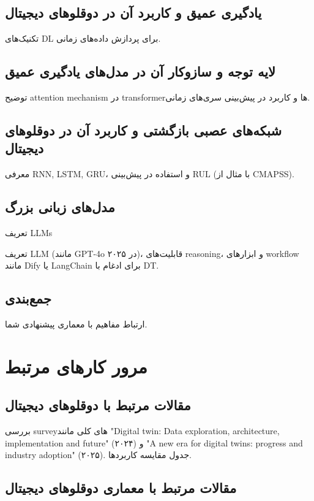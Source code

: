 \subsection{یادگیری عمیق و کاربرد آن در دوقلوهای دیجیتال}
تکنیک‌های DL برای پردازش داده‌های زمانی.


\subsection{لایه توجه و سازوکار آن در مدل‌های یادگیری عمیق}
توضیح attention mechanism در transformerها و کاربرد در پیش‌بینی سری‌های زمانی.


\subsection{شبکه‌های عصبی بازگشتی و کاربرد آن در دوقلوهای دیجیتال}
معرفی RNN, LSTM, GRU، و استفاده در پیش‌بینی RUL (با مثال از CMAPSS).


\subsection{مدل‌های زبانی بزرگ}
تعریف \glspl{LLM}


تعریف LLM (مانند GPT-4o در ۲۰۲۵)، قابلیت‌های reasoning، و ابزارهای workflow مانند Dify یا LangChain برای ادغام با DT.

\subsection{جمع‌بندی}
ارتباط مفاهیم با معماری پیشنهادی شما.


\section{مرور کارهای مرتبط}

\subsection{مقالات مرتبط با دوقلوهای دیجیتال}

بررسی surveyهای کلی مانند "Digital twin: Data exploration, architecture, implementation and future" (۲۰۲۴) و "A new era for digital twins: progress and industry adoption" (۲۰۲۵). جدول مقایسه کاربردها.

\subsection{مقالات مرتبط با معماری دوقلوهای دیجیتال}

